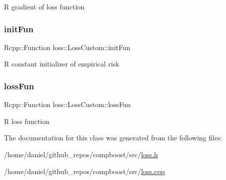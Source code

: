 {\ttfamily R} gradient of loss function 

\mbox{\label{classloss_1_1_loss_custom_aab9ba9ba105c5fa0e7e601830b6756ef}} 
\subsubsection{\texorpdfstring{init\+Fun}{initFun}}
{\footnotesize\ttfamily Rcpp\+::\+Function loss\+::\+Loss\+Custom\+::init\+Fun\hspace{0.3cm}{\ttfamily [private]}}



{\ttfamily R} constant initializer of empirical risk 

\mbox{\label{classloss_1_1_loss_custom_a5f527b03d50dc24934a9c5394f5eba54}} 
\subsubsection{\texorpdfstring{loss\+Fun}{lossFun}}
{\footnotesize\ttfamily Rcpp\+::\+Function loss\+::\+Loss\+Custom\+::loss\+Fun\hspace{0.3cm}{\ttfamily [private]}}



{\ttfamily R} loss function 



The documentation for this class was generated from the following files\+:\begin{DoxyCompactItemize}
\item 
/home/daniel/github\+\_\+repos/compboost/src/\hyperlink{loss_8h}{loss.\+h}\item 
/home/daniel/github\+\_\+repos/compboost/src/\hyperlink{loss_8cpp}{loss.\+cpp}\end{DoxyCompactItemize}
